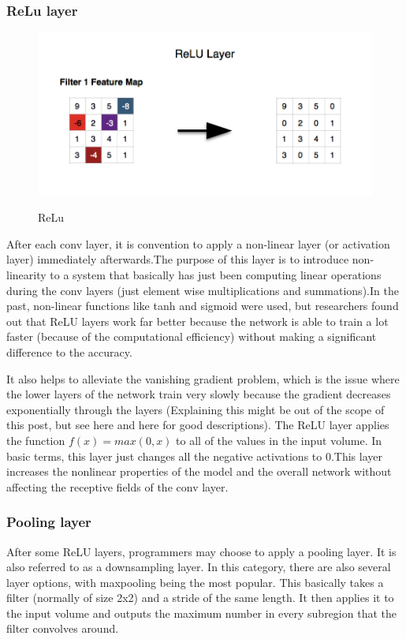 \documentclass[12pt]{article}
\begin{document}
	\subsubsection{ReLu layer}
 \begin{figure}[h]
    	\centering
    	\includegraphics[width=1\textwidth]{act.png}
       	\label{fig:mesh13}
	\caption{ReLu}
	\end{figure} 

After each conv layer, it is convention to apply a non-linear layer (or activation layer) immediately afterwards.The purpose of this layer is to introduce non-linearity to a system that basically has just been computing linear operations during the conv layers (just element wise multiplications and summations).In the past, non-linear functions like tanh and sigmoid were used, but researchers found out that ReLU layers work far better because the network is able to train a lot faster (because of the computational efficiency) without making a significant difference to the accuracy.

 It also helps to alleviate the vanishing gradient problem, which is the issue where the lower layers of the network train very slowly because the gradient decreases exponentially through the layers (Explaining this might be out of the scope of this post, but see here and here for good descriptions). The ReLU layer applies the function $f(x) = max(0, x)$ to all of the values in the input volume. In basic terms, this layer just changes all the negative activations to 0.This layer increases the nonlinear properties of the model and the overall network without affecting the receptive fields of the conv layer.
        
        \subsubsection{Pooling layer}
         After some ReLU layers, programmers may choose to apply a pooling layer. It is also referred to as a downsampling layer. In this category, there are also several layer options, with maxpooling being the most popular. This basically takes a filter (normally of size 2x2) and a stride of the same length. It then applies it to the input volume and outputs the maximum number in every subregion that the filter convolves around.
         
\end{document}
